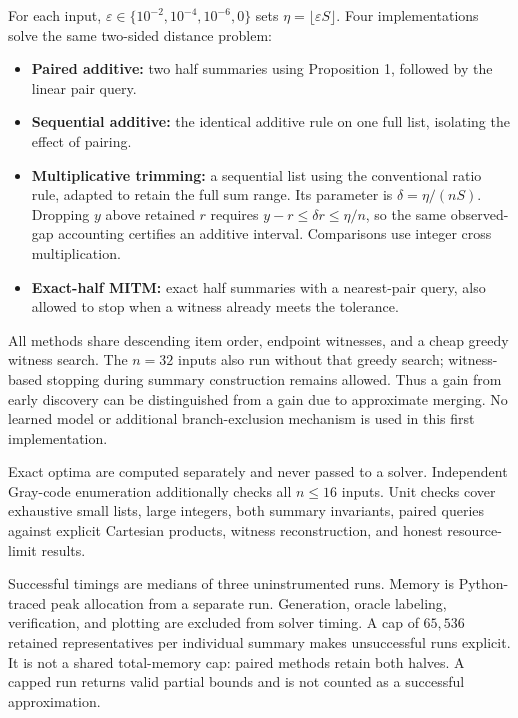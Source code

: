 \documentclass[10pt,english]{article}
\begin{document}
For each input, \(\varepsilon\in\{10^{-2},10^{-4},10^{-6},0\}\) sets \(\eta=\lfloor\varepsilon S\rfloor\). Four implementations solve the same two-sided distance problem:
\begin{itemize}
\item \textbf{Paired additive:} two half summaries using Proposition 1, followed by the linear pair query.
\item \textbf{Sequential additive:} the identical additive rule on one full list, isolating the effect of pairing.
\item \textbf{Multiplicative trimming:} a sequential list using the conventional ratio rule, adapted to retain the full sum range. Its parameter is \(\delta=\eta/(nS)\). Dropping \(y\) above retained \(r\) requires \(y-r\le\delta r\le\eta/n\), so the same observed-gap accounting certifies an additive interval. Comparisons use integer cross multiplication.
\item \textbf{Exact-half MITM:} exact half summaries with a nearest-pair query, also allowed to stop when a witness already meets the tolerance.
\end{itemize}

All methods share descending item order, endpoint witnesses, and a cheap greedy witness search. The \(n=32\) inputs also run without that greedy search; witness-based stopping during summary construction remains allowed. Thus a gain from early discovery can be distinguished from a gain due to approximate merging. No learned model or additional branch-exclusion mechanism is used in this first implementation.

Exact optima are computed separately and never passed to a solver. Independent Gray-code enumeration additionally checks all \(n\le16\) inputs. Unit checks cover exhaustive small lists, large integers, both summary invariants, paired queries against explicit Cartesian products, witness reconstruction, and honest resource-limit results.

Successful timings are medians of three uninstrumented runs. Memory is Python-traced peak allocation from a separate run. Generation, oracle labeling, verification, and plotting are excluded from solver timing. A cap of \(65{,}536\) retained representatives per individual summary makes unsuccessful runs explicit. It is not a shared total-memory cap: paired methods retain both halves. A capped run returns valid partial bounds and is not counted as a successful approximation.
\end{document}
